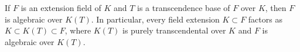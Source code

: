 If $F$ is an extension field of $K$ and $T$ is a transcendence base of $F$ over $K$, then $F$ is algebraic over $K(T)$.
In particular, every field extension $K \subset F$ factors as $K \subset K(T) \subset F$, where $K(T)$ is purely transcendental over $K$ and $F$ is algebraic over $K(T)$.
